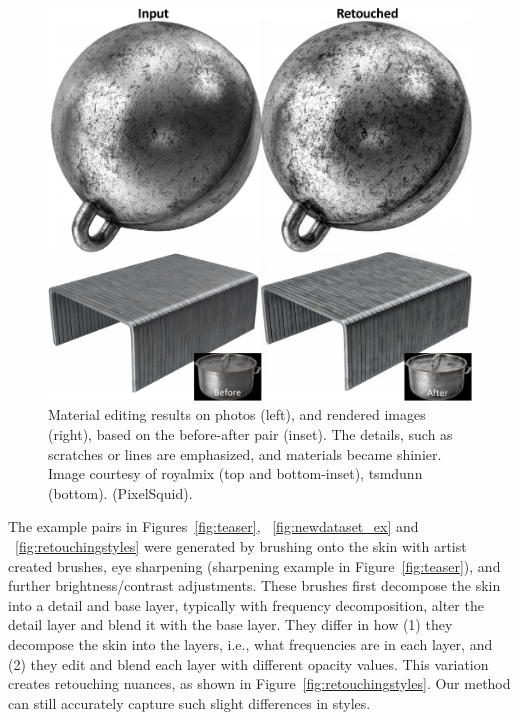 \begin{figure}[th] %
	\centering
	\includegraphics[width=0.8\columnwidth]{Chapters/detail-retouching-figs/MaterialResults.pdf}
    \caption{\label{fig:material_res}Material editing results on photos (left), and rendered images (right), based on the before-after pair (inset). The details, such as scratches or lines are emphasized, and materials became shinier. Image courtesy of royalmix (top and bottom-inset), tsmdunn (bottom). (PixelSquid).}

\end{figure}

The example pairs in Figures~\ref{fig:teaser}, ~\ref{fig:newdataset_ex}  and ~\ref{fig:retouchingstyles} were generated by brushing onto the skin with artist created brushes, eye sharpening (sharpening example in Figure~\ref{fig:teaser}), and further brightness/contrast adjustments. These brushes first decompose the skin into a detail and base layer, typically with frequency decomposition, alter the detail layer and blend it with the base layer. They differ in how (1) they decompose the skin into the layers, i.e., what frequencies are in each layer, and (2) they edit and blend each layer with different opacity values. This variation creates retouching nuances, as shown in Figure~\ref{fig:retouchingstyles}. Our method can still accurately capture such slight differences in styles. 

